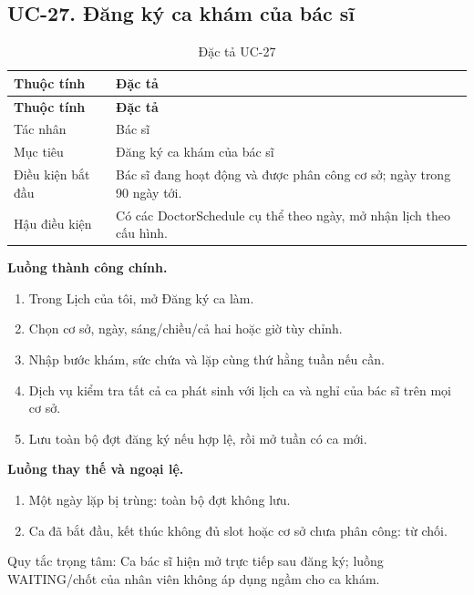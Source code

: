 \clearpage

\subsection{UC-27.\allowbreak{} Đăng ký ca khám của bác sĩ}
\label{uc:27}

{\small\setlength{\tabcolsep}{3pt}\renewcommand{\arraystretch}{1.12}
\begin{longtable}{@{}L{\textwidth-1.32pt\relax} L{\textwidth-4.68pt\relax}@{}}
\caption{Đặc tả UC-27}\\
\toprule
\textbf{Thuộc tính} & \textbf{Đặc tả}\\\midrule
\endfirsthead
\toprule
\textbf{Thuộc tính} & \textbf{Đặc tả}\\\midrule
\endhead
\bottomrule\endlastfoot
Tác nhân & Bác sĩ\\[3pt]
Mục tiêu & Đăng ký ca khám của bác sĩ\\[3pt]
Điều kiện bắt đầu & Bác sĩ đang hoạt động và được phân công cơ sở; ngày trong 90 ngày tới.\allowbreak{}\\[3pt]
Hậu điều kiện & Có các Doctor\allowbreak{}Schedule cụ thể theo ngày, mở nhận lịch theo cấu hình.\allowbreak{}\\[3pt]
\end{longtable}}
\noindent\textbf{Luồng thành công chính.}
\begin{enumerate}
\item Trong Lịch của tôi, mở Đăng ký ca làm.\allowbreak{}
\item Chọn cơ sở, ngày, sáng/\allowbreak{}chiều/\allowbreak{}cả hai hoặc giờ tùy chỉnh.\allowbreak{}
\item Nhập bước khám, sức chứa và lặp cùng thứ hằng tuần nếu cần.\allowbreak{}
\item Dịch vụ kiểm tra tất cả ca phát sinh với lịch ca và nghỉ của bác sĩ trên mọi cơ sở.\allowbreak{}
\item Lưu toàn bộ đợt đăng ký nếu hợp lệ, rồi mở tuần có ca mới.\allowbreak{}
\end{enumerate}
\noindent\textbf{Luồng thay thế và ngoại lệ.}
\begin{enumerate}
\item Một ngày lặp bị trùng:\allowbreak{} toàn bộ đợt không lưu.\allowbreak{}
\item Ca đã bắt đầu, kết thúc không đủ slot hoặc cơ sở chưa phân công:\allowbreak{} từ chối.\allowbreak{}
\end{enumerate}
Quy tắc trọng tâm:\allowbreak{} Ca bác sĩ hiện mở trực tiếp sau đăng ký; luồng WAITING/\allowbreak{}chốt của nhân viên không áp dụng ngầm cho ca khám.\allowbreak{}

